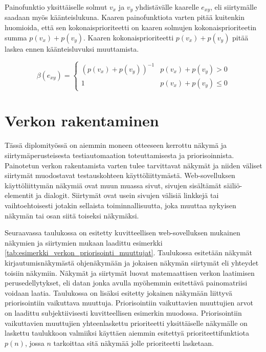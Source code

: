  Painofunktio yksittäiselle solmut \(v_x\) ja \(v_y\) yhdistävälle kaarelle \(e_{xy}\), eli siirtymälle saadaan myös käänteislukuna.
  Kaaren painofunktiota varten pitää kuitenkin huomioida, että sen kokonaisprioriteetti on kaaren solmujen kokonaisprioriteetin summa \(p(v_x) + p(v_y)\).
  Kaaren kokonaisprioriteetti \(p(v_x) + p(v_y)\) pitää laskea ennen käänteisluvuksi muuttamista.

  \[\beta(e_{xy}) = \begin{cases}
    (p(v_x) + p(v_y))^{-1} & p(v_x) + p(v_y) > 0 \\
    1 & p(v_x) + p(v_y) \leq 0
  \end{cases}\]

\section{Verkon rakentaminen} \label{ch:10_verkon_rakentaminen}

  Tässä diplomityössä on aiemmin moneen otteeseen kerrottu näkymä ja siirtymäperusteisesta testiautomaation toteuttamisesta ja priorisoinnista.
  Painotetun verkon rakentamista varten tulee tarvittavat näkymät ja niiden väliset siirtymät muodostavat testauskohteen käyttöliittymästä.
  Web-sovelluksen käyttöliittymän näkymiä ovat muun muassa sivut, sivujen sisältämät säiliö-elementit ja dialogit.
  Siirtymät ovat usein sivujen välisiä linkkejä tai vaihtoehtoisesti jotakin sellaista toiminnallisuutta, joka muuttaa nykyisen näkymän tai osan siitä toiseksi näkymäksi.

  Seuraavassa taulukossa on esitetty kuvitteellisen web-sovelluksen mukainen näkymien ja siirtymien mukaan laadittu esimerkki \ref{tab:esimerkki_verkon_priorisointi_muuttujat}.
  Taulukossa esitetään näkymät kirjautumisnäkymästä ohjenäkymään ja jokaisen näkymän siirtymät eli yhteydet toisiin näkymiin.
  Näkymät ja siirtymät luovat matemaattisen verkon laatimisen perusedellytykset, eli datan jonka avulla myöhemmin esitettävä painomatriisi voidaan laatia.
  Taulukossa on lisäksi esitetty jokainen näkymään liittyvä priorisointiin vaikuttava muuttuja.
  Priorisointiin vaikuttavien muuttujien arvot on laadittu subjektiivisesti kuvitteellisen esimerkin muodossa.
  Priorisointiin vaikuttavien muuttujien yhteenlaskettu prioriteetti yksittäiselle näkymälle on laskettu taulukkoon valmiiksi käyttäen aiemmin esitettyä prioriteettifunktiota \(p(n)\), jossa \(n\) tarkoittaa sitä näkymää jolle prioriteetti lasketaan.

